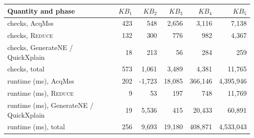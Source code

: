 \begin{tabular}{lrrrrr}
\toprule
Quantity and phase & $KB_1$ & $KB_2$ & $KB_3$ & $KB_4$ & $KB_5$ \\
\midrule
checks, AcqMss & 423 & 548 & 2{,}656 & 3{,}116 & 7{,}138 \\
checks, \textsc{Reduce} & 132 & 300 & 776 & 982 & 4{,}367 \\
checks, GenerateNE / QuickXplain & 18 & 213 & 56 & 284 & 259 \\
checks, total & 573 & 1{,}061 & 3{,}489 & 4{,}381 & 11{,}765 \\
runtime (ms), AcqMss & 202 & -1{,}723 & 18{,}085 & 366{,}146 & 4{,}395{,}946 \\
runtime (ms), \textsc{Reduce} & 9 & 53 & 197 & 748 & 11{,}769 \\
runtime (ms), GenerateNE / QuickXplain & 19 & 5{,}536 & 415 & 20{,}433 & 60{,}891 \\
runtime (ms), total & 256 & 9{,}693 & 19{,}180 & 408{,}871 & 4{,}533{,}043 \\
\bottomrule
\end{tabular}
